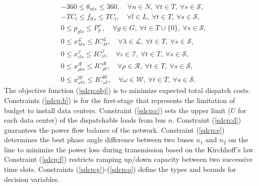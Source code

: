 \begin{subequations}
\begin{align}
	&-360\le\theta_{nts}\le 360,\quad\forall n\in N,\ \forall t\in T,\ \forall s\in\mathcal{S},\label{sdcp:i}\\
	&-TC_l\le f_{lts}\le TC_l,\quad\forall l\in L,\ \forall t\in T,\ \forall s\in\mathcal{S},\label{sdcp:j}\\
	&0\le p_{gts}\le P_g^+,\quad\forall g\in G,\ \forall t\in T\cup\{0\},\ \forall s\in\mathcal{S},\label{sdcp:k}\\
	&0\le x_{\lambda ts}^\mathcal{L}\le IC_{\lambda t}^\mathcal{L},\quad\forall \lambda\in \mathcal{L},\ \forall t\in T,\ \forall s\in\mathcal{S},\label{sdcp:l}\\
	&0\le x_{\iota ts}^\mathcal{I}\le IC_{\iota t}^\mathcal{I},\quad\forall \iota \in \mathcal{I},\ \forall t\in T,\ \forall s\in\mathcal{S},\label{sdcp:m}\\
	&0\le x_{\rho ts}^\mathcal{R} \le IC_{\rho t}^\mathcal{R},\quad\forall \rho\in\mathcal{R},\ \forall t\in T,\ \forall s\in\mathcal{S},\label{sdcp:n}\\
	&0\le x_{\omega ts}^\mathcal{W}\le IC_{\omega t}^W,\quad\forall \omega\in\mathcal{W},\ \forall t\in T,\ \forall s\in\mathcal{S}.\label{sdcp:o}
	\end{align}	
\end{subequations}
The objective function (\ref{sdcp:obj}) is to minimize expected total dispatch costs. Constraints (\ref{sdcp:b}) is for the first-stage that represents the limitation of budget to install data centers. Constraint (\ref{sdcp:c}) sets the upper limit ($U$ for each data center) of the dispatchable loads from bus $n$. Constraint (\ref{sdcp:d}) guarantees the power flow balance of the network. Constraint (\ref{sdcp:e}) determines the best phase angle difference between two buses $n_1$ and $n_2$ on the line to minimize the power loss during transmission based on the Kirchhoff's law. Constraint (\ref{sdcp:f}) restricts ramping up/down capacity between two successive time slots. Constraints (\ref{sdcp:g})-(\ref{sdcp:o}) define the types and bounds for decision variables.

